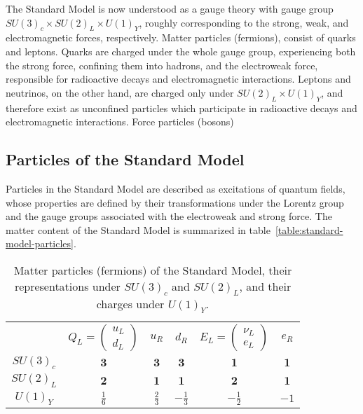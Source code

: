 The Standard Model is now understood as a gauge theory with gauge group $SU(3)_c\times SU(2)_L \times U(1)_Y$, roughly corresponding to the strong, weak, and electromagnetic forces, respectively. Matter particles (fermions), consist of quarks and leptons. Quarks are charged under the whole gauge group, experiencing both the strong force, confining them into hadrons, and the electroweak force, responsible for radioactive decays and electromagnetic interactions. Leptons and neutrinos, on the other hand, are charged only under $SU(2)_L\times U(1)_Y$, and therefore exist as unconfined particles which participate in radioactive decays and electromagnetic interactions. Force particles (bosons) 

\subsection{Particles of the Standard Model}

Particles in the Standard Model are described as excitations of quantum fields, whose properties are defined by their transformations under the Lorentz group and the gauge groups associated with the electroweak and strong force. 
The matter content of the Standard Model is summarized in table~\ref{table:standard-model-particles}. 

\begin{table}
	\centering
	\begin{tabular}{cccccc}
		 & $Q_L=\left(\begin{array}{c} u_L \\ d_L \end{array}\right)$ & $u_R$ & $d_R$ & $E_L=\left(\begin{array}{c} \nu_L \\ e_L \end{array}\right) $ & $e_R$ \\
		$SU(3)_c$ & $\mathbf{3}$ &  $\mathbf{3}$ & $\mathbf{3}$ & $\mathbf{1}$ & $\mathbf{1}$ \\
		$SU(2)_L$ & $\mathbf{2}$ & $\mathbf{1}$ & $\mathbf{1}$ & $\mathbf{2}$ & $\mathbf{1}$ \\
		$U(1)_Y$ & $\frac16$ & $\frac23$ & $-\frac13$ & $-\frac12$ & $-1$ \\
	\end{tabular}
	\caption{Matter particles (fermions) of the Standard Model, their representations under $SU(3)_c$ and $SU(2)_L$, and their charges under $U(1)_Y$.}
\end{table}



